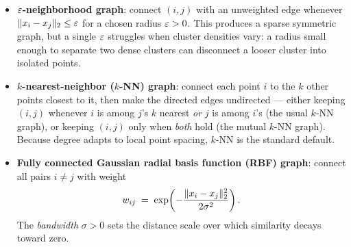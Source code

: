 \begin{itemize}
  \item \textbf{$\varepsilon$-neighborhood graph}: connect $(i,j)$ with an unweighted edge whenever $\lVert x_i-x_j\rVert_2\le\varepsilon$ for a chosen radius $\varepsilon > 0$. This produces a sparse symmetric graph, but a single $\varepsilon$ struggles when cluster densities vary: a radius small enough to separate two dense clusters can disconnect a looser cluster into isolated points.
  \item \textbf{$k$-nearest-neighbor ($k$-NN) graph}: connect each point $i$ to the $k$ other points closest to it, then make the directed edges undirected --- either keeping $(i,j)$ whenever $i$ is among $j$'s $k$ nearest \emph{or} $j$ is among $i$'s (the usual $k$-NN graph), or keeping $(i,j)$ only when \emph{both} hold (the mutual $k$-NN graph). Because degree adapts to local point spacing, $k$-NN is the standard default.
  \item \textbf{Fully connected Gaussian radial basis function (RBF) graph}: connect all pairs $i \ne j$ with weight
  \[
    w_{ij} \;=\; \exp\!\left(-\frac{\lVert x_i-x_j\rVert_2^2}{2\sigma^2}\right).
  \]
  The \emph{bandwidth} $\sigma > 0$ sets the distance scale over which similarity decays toward zero.
\end{itemize}

